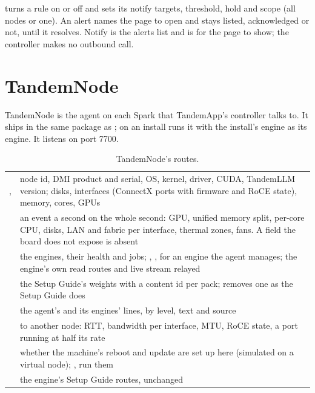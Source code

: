  turns a rule on or off and sets its notify targets, threshold, hold and scope (all nodes or one). An alert names the page to open and stays listed, acknowledged or not, until it resolves. Notify  is the alerts list and  is for the page to show; the controller makes no outbound call.

\section{TandemNode}\label{sec:tandemnode}

TandemNode is the agent on each Spark that TandemApp's controller talks to. It ships in the same package as ; on an  install  runs it with the install's engine as its engine. It listens on port 7700.

\begin{table}[htbp]
\centering\small
\caption{TandemNode's routes.}\label{tab:tandemnode}
\begin{tabularx}{\linewidth}{@{}L{.3\linewidth}Y@{}}
\toprule
{} &  \\
\midrule
{},  & node id, DMI product and serial, OS, kernel, driver, CUDA, TandemLLM version; disks, interfaces (ConnectX ports with firmware and RoCE state), memory, cores, GPUs \\
 & an event a second on the whole second: GPU, unified memory split, per-core CPU, disks, LAN and fabric per interface, thermal zones, fans. A field the board does not expose is absent \\
 & the engines, their health and jobs; , ,  for an engine the agent manages; the engine's own read routes and live stream relayed \\
 & the Setup Guide's weights with a content id per pack;  removes one as the Setup Guide does \\
 & the agent's and its engines' lines, by level, text and source \\
 & to another node: RTT, bandwidth per interface, MTU, RoCE state, a port running at half its rate \\
 & whether the machine's reboot and update are set up here (simulated on a virtual node); ,  run them \\
 & the engine's Setup Guide routes, unchanged \\
\bottomrule
\end{tabularx}
\end{table}

